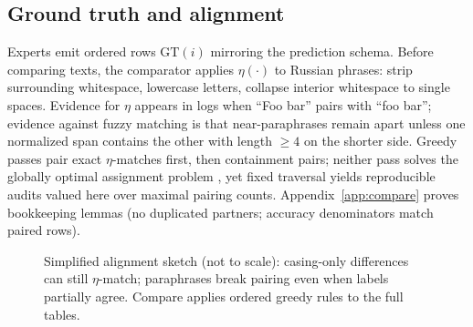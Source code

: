 \documentclass[11pt,a4paper]{article}
\theoremstyle{remark}
\newcommand{\Pred}{\mathrm{Pred}}
\newcommand{\GT}{\mathrm{GT}}
\begin{document}
\subsection{Ground truth and alignment}
Experts emit ordered rows $\GT(i)$ mirroring the prediction schema. Before comparing texts, the comparator applies $\eta(\cdot)$ to Russian phrases: strip surrounding whitespace, lowercase letters, collapse interior whitespace to single spaces. Evidence for $\eta$ appears in logs when ``Foo bar'' pairs with ``foo  bar''; evidence against fuzzy matching is that near-paraphrases remain apart unless one normalized span contains the other with length $\ge 4$ on the shorter side. Greedy passes pair exact $\eta$-matches first, then containment pairs; neither pass solves the globally optimal assignment problem \citep{kuhn1955hungarian}, yet fixed traversal yields reproducible audits valued here over maximal pairing counts. Appendix~\ref{app:compare} proves bookkeeping lemmas (no duplicated partners; accuracy denominators match paired rows).

\begin{figure}[htbp]
\centering
{}
\caption{Simplified alignment sketch (not to scale): casing-only differences can still $\eta$-match; paraphrases break pairing even when labels partially agree. Compare applies ordered greedy rules to the full tables.}
\label{fig:alignment_sketch}
\end{figure}
\end{document}
